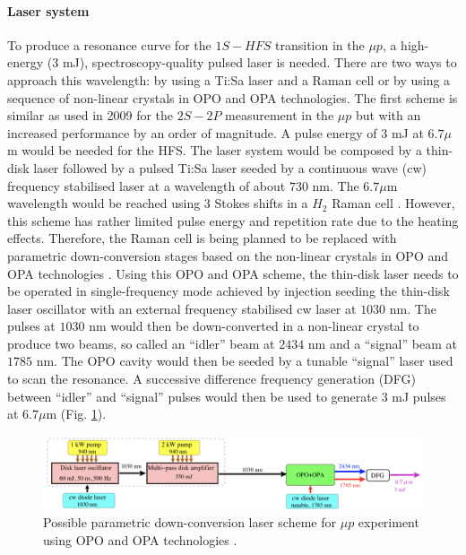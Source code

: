 \documentclass[12pt]{article}
\begin{document}
\paragraph{Laser system}
To produce a resonance curve for the $1S - HFS$ transition in the $\mu{p}$, a high-energy ($3$ mJ), spectroscopy-quality pulsed laser is needed. There are two ways to approach this wavelength: by using a Ti:Sa laser and a Raman cell or by using a sequence of non-linear crystals in OPO and OPA technologies.
The first scheme is similar as used in 2009 for the $2S-2P$ measurement in the $\mu{p}$ but with an increased performance by an order of magnitude. A pulse energy of $3$ mJ at $6.7 {\mu}$m would be needed for the HFS. The laser system would be composed by a thin-disk laser followed by a pulsed Ti:Sa laser seeded by a continuous wave (cw) frequency stabilised laser at a wavelength of about $730$ nm. The $6.7 {\mu}$m wavelength would be reached using $3$ Stokes shifts in a $H_2$ Raman cell \cite{proposal}. However, this scheme has rather limited pulse energy and repetition rate due to the heating effects. Therefore, the Raman cell is being planned to be replaced with parametric down-conversion stages based on the non-linear crystals in OPO and OPA technologies \cite{opo}.
Using this OPO and OPA scheme, the thin-disk laser needs to be operated in single-frequency mode achieved by injection seeding the thin-disk laser oscillator with an external frequency stabilised cw laser at $1030$ nm. The pulses at $1030$ nm would then be down-converted in a non-linear crystal to produce two beams, so called an ``idler'' beam at $2434$ nm and a ``signal'' beam at $1785$ nm. The OPO cavity would then be seeded by a tunable ``signal'' laser used to scan the resonance. A successive difference frequency generation (DFG) between ``idler'' and ``signal'' pulses would then be used to generate $3$ mJ pulses at $6.7 {\mu}$m (Fig. \ref{fig:opopascheme}). 
\begin{figure}[h]
\includegraphics[width=1.0\textwidth]{img/OPOschemeOPA}
\caption{Possible parametric down-conversion laser scheme for $\mu{p}$ experiment using OPO and OPA technologies \cite{proposal}.}
\label{fig:opopascheme}
\end{figure}
\end{document}
